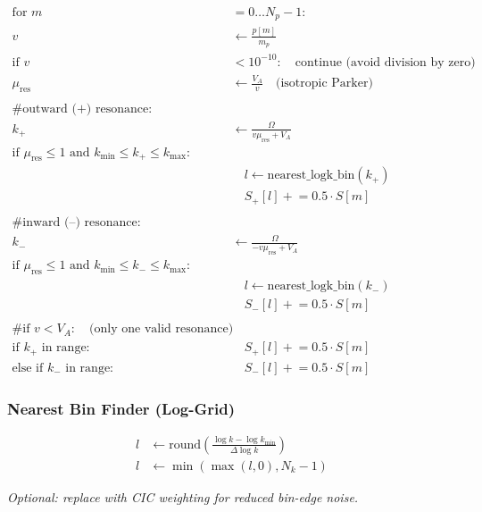 \[
\begin{aligned}
\text{for } m &= 0 \dots N_p{-}1: \\
v &\leftarrow \frac{p[m]}{m_p} \\
\text{if } v &< 10^{-10}: \quad \text{continue (avoid division by zero)} \\
\mu_{\text{res}} &\leftarrow \frac{V_A}{v} \quad \text{(isotropic Parker)} \\
\\
\text{\# outward (+) resonance:} \\
k_{+} &\leftarrow \frac{\Omega}{v \mu_{\text{res}} + V_A} \\
\text{if } \mu_{\text{res}} \leq 1 \text{ and } k_{\min} \leq k_{+} \leq k_{\max}: \\
&\quad l \leftarrow \text{nearest\_logk\_bin}(k_{+}) \\
&\quad S_{+}[l] \mathrel{+}= 0.5 \cdot S[m] \\
\\
\text{\# inward (–) resonance:} \\
k_{-} &\leftarrow \frac{\Omega}{-v \mu_{\text{res}} + V_A} \\
\text{if } \mu_{\text{res}} \leq 1 \text{ and } k_{\min} \leq k_{-} \leq k_{\max}: \\
&\quad l \leftarrow \text{nearest\_logk\_bin}(k_{-}) \\
&\quad S_{-}[l] \mathrel{+}= 0.5 \cdot S[m] \\
\\
\text{\# if } v < V_A: \quad \text{(only one valid resonance)} \\
\text{if } k_{+} \text{ in range: } &\quad S_{+}[l] \mathrel{+}= 0.5 \cdot S[m] \\
\text{else if } k_{-} \text{ in range: } &\quad S_{-}[l] \mathrel{+}= 0.5 \cdot S[m]
\end{aligned}
\]

\subsubsection*{Nearest Bin Finder (Log-Grid)}
\[
\begin{aligned}
l &\leftarrow \text{round}\left( \frac{\log k - \log k_{\min}}{\Delta \log k} \right) \\
l &\leftarrow \min\left( \max(l, 0), N_k{-}1 \right)
\end{aligned}
\]

\emph{Optional: replace with CIC weighting for reduced bin-edge noise.}

